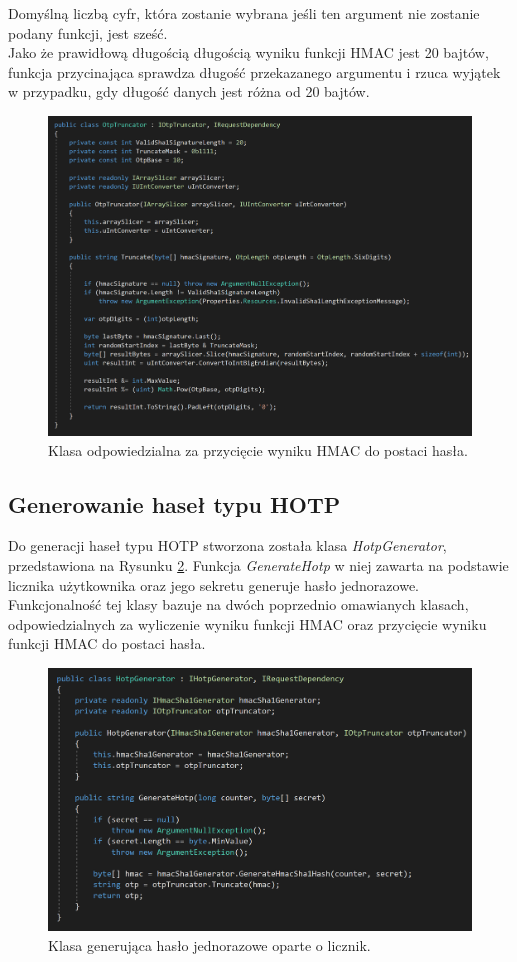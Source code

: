Domyślną liczbą cyfr, która zostanie wybrana jeśli ten argument nie zostanie podany funkcji, jest sześć. \\
Jako że prawidłową długością długością wyniku funkcji HMAC jest 20 bajtów, funkcja przycinająca sprawdza 
długość przekazanego argumentu i rzuca wyjątek w przypadku, gdy długość danych jest różna od 20 bajtów.
\begin{figure}[t]
    \centering
	\includegraphics[width=\textwidth]{content/images/code-truncator}
    \caption{Klasa odpowiedzialna za przycięcie wyniku HMAC do postaci hasła.}
    \label{code-truncator}
\end{figure}

\subsection{Generowanie haseł typu HOTP}
Do generacji haseł typu HOTP stworzona została klasa \textit{HotpGenerator}, przedstawiona na Rysunku \ref{code-hotp}.
Funkcja \textit{GenerateHotp} w niej zawarta na podstawie licznika użytkownika oraz jego sekretu generuje hasło jednorazowe.
Funkcjonalność tej klasy bazuje na dwóch poprzednio omawianych klasach, odpowiedzialnych za wyliczenie wyniku funkcji HMAC oraz 
przycięcie wyniku funkcji HMAC do postaci hasła.
\begin{figure}[t]
    \centering
	\includegraphics[width=\textwidth]{content/images/code-hotpgenerator}
    \caption{Klasa generująca hasło jednorazowe oparte o licznik.}
    \label{code-hotp}
\end{figure}

